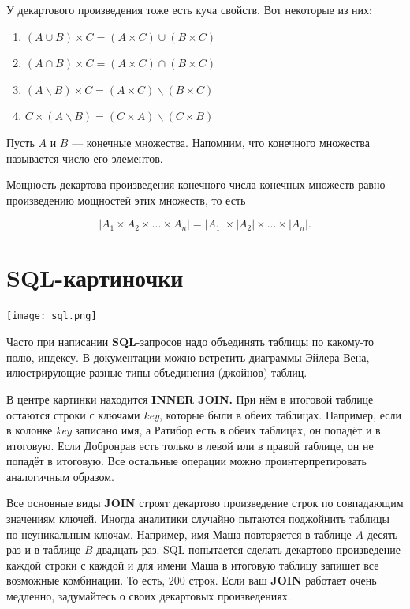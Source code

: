 \documentclass[12pt, a4paper]{article}
\begin{document}
У декартового произведения тоже есть куча свойств. Вот некоторые из них:

\begin{enumerate}
    \item $(A \cup B) \times C = (A \times C) \cup (B \times C)$
    \item $(A \cap B) \times C = (A \times C) \cap (B \times C)$
    \item $(A \backslash B) \times C = (A \times C) \backslash (B \times C)$
    \item $C \times  (A \backslash B) = (C \times A) \backslash (C \times B)$
\end{enumerate}

Пусть $A$ и $B$ --- конечные множества. Напомним, что  конечного множества называется число его элементов. 

\begin{myth}
Мощность декартова произведения конечного числа конечных множеств равно произведению мощностей этих множеств, то есть 

\[
|A_1 \times A_2 \times ... \times  A_n| = |A_1| \times |A_2| \times ... \times |A_n|.
\]
\end{myth}

\section{SQL-картиночки}

\begin{center}
    \texttt{[image: sql.png]}
\end{center}

Часто при написании \textbf{SQL}-запросов надо объединять таблицы по какому-то полю, индексу. В документации можно встретить диаграммы Эйлера-Вена, илюстрирующие разные типы объединения (джойнов) таблиц.

В центре картинки находится \textbf{INNER JOIN.} При нём в итоговой таблице остаются строки с ключами \textit{key}, которые были в обеих таблицах. Например, если в колонке  \textit{key} записано имя, а Ратибор есть в обеих таблицах, он попадёт и в итоговую. Если Добронрав есть только в левой или в правой таблице, он не попадёт в итоговую. Все остальные операции можно проинтерпретировать аналогичным образом.

Все основные виды \textbf{JOIN} строят декартово произведение строк по совпадающим значениям ключей. Иногда аналитики случайно пытаются поджойнить таблицы по неуникальным ключам. Например, имя Маша повторяется в таблице $A$ десять раз и в таблице $B$ двадцать раз. SQL попытается сделать декартово произведение каждой строки с каждой и для имени Маша в итоговую таблицу запишет все возможные комбинации. То есть, $200$ строк. Если ваш \textbf{JOIN} работает очень медленно, задумайтесь о своих декартовых произведениях. 
\end{document}
